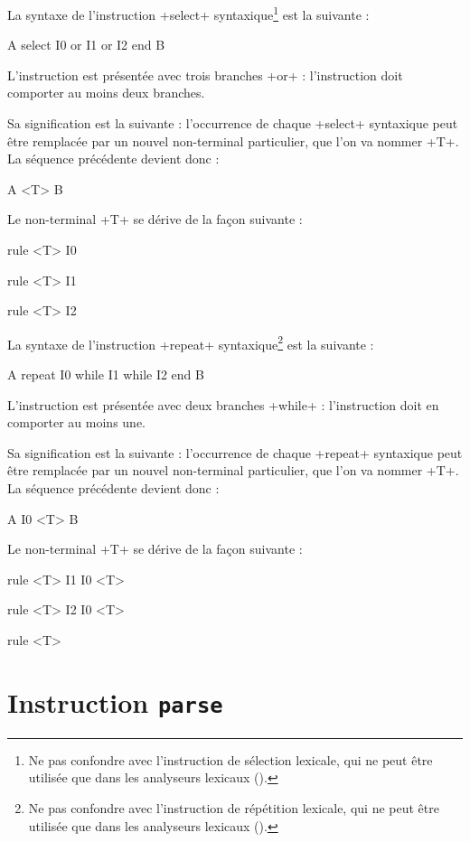 
La syntaxe de l'instruction \ggsq+select+ syntaxique\footnote{Ne pas confondre avec l'instruction de sélection lexicale, qui ne peut être utilisée que dans les analyseurs lexicaux ().} est la suivante :
\begin{galgas4}
A
select
  I0
or
  I1
or
  I2
end
B
\end{galgas4}

L'instruction est présentée avec trois branches \ggsq+or+ : l'instruction doit comporter au moins deux branches.

Sa signification est la suivante : l'occurrence de chaque \ggsq+select+ syntaxique peut être remplacée par un nouvel non-terminal particulier, que l'on va nommer \ggsq+T+. La séquence précédente devient donc :
\begin{galgas4}
A
<T>
B
\end{galgas4}

Le non-terminal \ggsq+T+ se dérive de la façon suivante :
\begin{galgas4}
rule <T> { I0 }

rule <T> { I1 }

rule <T> { I2 }
\end{galgas4}








La syntaxe de l'instruction \ggsq+repeat+ syntaxique\footnote{Ne pas confondre avec l'instruction de répétition lexicale, qui ne peut être utilisée que dans les analyseurs lexicaux ().} est la suivante :
\begin{galgas4}
A
repeat
  I0
while
  I1
while
  I2
end
B
\end{galgas4}

L'instruction est présentée avec deux branches \ggsq+while+ : l'instruction doit en comporter au moins une.

Sa signification est la suivante : l'occurrence de chaque \ggsq+repeat+ syntaxique peut être remplacée par un nouvel non-terminal particulier, que l'on va nommer \ggsq+T+. La séquence précédente devient donc :
\begin{galgas4}
A
I0
<T>
B
\end{galgas4}

Le non-terminal \ggsq+T+ se dérive de la façon suivante :
\begin{galgas4}
rule <T> { I1 I0 <T> }

rule <T> { I2 I0 <T> }

rule <T> {  }
\end{galgas4}







\section{Instruction \texttt{parse}}











